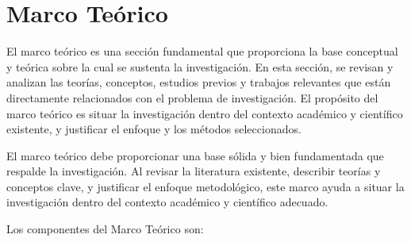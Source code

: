 \chapter{Marco Teórico}

El marco teórico es una sección fundamental que proporciona la base conceptual y teórica sobre la cual se sustenta la investigación. En esta sección, se revisan y analizan las teorías, conceptos, estudios previos y trabajos relevantes que están directamente relacionados con el problema de investigación. El propósito del marco teórico es situar la investigación dentro del contexto académico y científico existente, y justificar el enfoque y los métodos seleccionados.

El marco teórico  debe proporcionar una base sólida y bien fundamentada que respalde la investigación. Al revisar la literatura existente, describir teorías y conceptos clave, y justificar el enfoque metodológico, este marco ayuda a situar la investigación dentro del contexto académico y científico adecuado.

Los componentes del Marco Teórico son:

